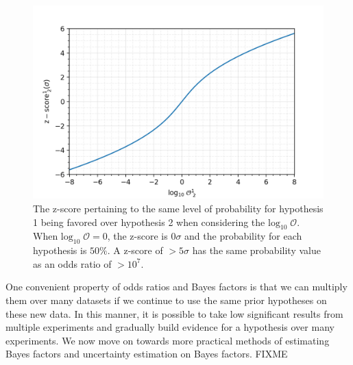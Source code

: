 \begin{figure}
  \includegraphics[width=\textwidth]{figs/chapter5/log10odds_z_score.png}
  \caption{The z-score pertaining to the same level of probability for  hypothesis 1 being favored over hypothesis 2 when considering the $\mathrm{log}_{10} \; \mathcal{O}$. When $\mathrm{log}_{10} \; \mathcal{O} = 0$, the z-score is $0 \sigma$ and the probability for each hypothesis is $50\%$. A z-score of $>5 \sigma$ has the same probability value as an odds ratio of $> 10^7$.}
  \label{fig:log10odds_v_z_score}
\end{figure}

One convenient property of odds ratios and Bayes factors is that we can multiply them over many datasets if we continue to use the same prior hypotheses on these new data. In this manner, it is possible to take low significant results from multiple experiments and gradually build evidence for a hypothesis over many experiments. We now move on towards more practical methods of estimating Bayes factors and uncertainty estimation on Bayes factors.
FIXME

